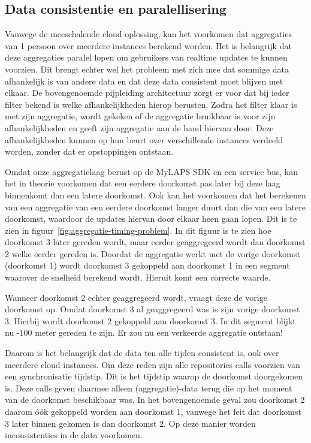\subsection{Data consistentie en paralellisering}
Vanwege de meeschalende cloud oplossing, kan het voorkomen dat aggregaties van 1 persoon over meerdere instances berekend worden. Het is belangrijk dat deze aggregaties paralel lopen om gebruikers van realtime updates te kunnen voorzien. Dit brengt echter wel het probleem met zich mee dat sommige data afhankelijk is van andere data en dat deze data consistent moet blijven met elkaar. De bovengenoemde pijpleiding architectuur zorgt er voor dat bij ieder filter bekend is welke afhankelijkheden hierop berusten. Zodra het filter klaar is met zijn aggregatie, wordt gekeken of de aggregatie bruikbaar is voor zijn afhankelijkheden en geeft zijn aggregatie aan de hand hiervan door. Deze afhankelijkheden kunnen op hun beurt over verschillende instances verdeeld worden, zonder dat er opstoppingen ontstaan.

Omdat onze aggregatielaag berust op de MyLAPS SDK en een service bus, kan het in theorie voorkomen dat een eerdere doorkomst pas later bij deze laag binnenkomt dan een latere doorkomst. Ook kan het voorkomen dat het berekenen van een aggregatie van een eerdere doorkomst langer duurt dan die van een latere doorkomst, waardoor de updates hiervan door elkaar heen gaan lopen. Dit is te zien in figuur~\ref{fig:aggregatie-timing-problem}. 
In dit figuur is te zien hoe doorkomst 3 later gereden wordt, maar eerder geaggregeerd wordt dan doorkomst 2 welke eerder gereden is. Doordat de aggregatie werkt met de vorige doorkomst (doorkomst 1) wordt doorkomst 3 gekoppeld aan doorkomst 1 in een segment waarover de snelheid berekend wordt. Hieruit komt een correcte waarde.

Wanneer doorkomst 2 echter geaggregeerd wordt, vraagt deze de vorige doorkomst op. Omdat doorkomst 3 al geaggregeerd was is zijn vorige doorkomst 3. Hierbij wordt doorkomst 2 gekoppeld aan doorkomst 3. In dit segment blijkt nu -100 meter gereden te zijn. Er zou nu een verkeerde aggregatie ontstaan!

Daarom is het belangrijk dat de data ten alle tijden consistent is, ook over meerdere cloud instances.
Om deze reden zijn alle repositories calls voorzien van een synchronisatie tijdstip. Dit is het tijdstip waarop de doorkomst doorgekomen is. Deze calls geven daarmee alleen (aggregatie)-data terug die op het moment van de doorkomst beschikbaar was. In het bovengenoemde geval zou doorkomst 2 daarom óók gekoppeld worden aan doorkomst 1, vanwege het feit dat doorkomst 3 later binnen gekomen is dan doorkomst 2. Op deze manier worden inconsistenties in de data voorkomen.

